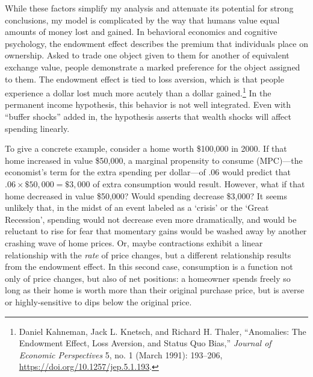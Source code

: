 \documentclass[12pt,oneside]{psthesis}
\begin{document}
While these factors simplify my analysis and attenuate its potential for strong conclusions, my model is complicated by the way that humans value equal amounts of money lost and gained.
In behavioral economics and cognitive psychology, the endowment effect describes the premium that individuals place on ownership.
Asked to trade one object given to them for another of equivalent exchange value, people demonstrate a marked preference for the object assigned to them.
The endowment effect is tied to loss aversion, which is that people experience a dollar lost much more acutely than a dollar gained.\footnote{Daniel Kahneman, Jack L. Knetsch, and Richard H. Thaler, ``Anomalies: The Endowment Effect, Loss Aversion, and Status Quo Bias,'' \emph{Journal of Economic Perspectives} 5, no. 1 (March 1991): 193--206, \url{https://doi.org/10.1257/jep.5.1.193}.}
In the permanent income hypothesis, this behavior is not well integrated.
Even with ``buffer shocks'' added in, the hypothesis asserts that wealth shocks will affect spending linearly.

To give a concrete example, consider a home worth \$100,000 in 2000.
If that home increased in value \$50,000, a marginal propensity to consume (MPC)---the economist's term for the extra spending per dollar---of .06 would predict that \(.06 \times \$50,000 = \$3,000\) of extra consumption would result.
However, what if that home decreased in value \$50,000?
Would spending decrease \$3,000?
It seems unlikely that, in the midst of an event labeled as a `crisis' or the `Great Recession', spending would not decrease even more dramatically, and would be reluctant to rise for fear that momentary gains would be washed away by another crashing wave of home prices.
Or, maybe contractions exhibit a linear relationship with the \emph{rate} of price changes, but a different relationship results from the endowment effect.
In this second case, consumption is a function not only of price changes, but also of net positions: a homeowner spends freely so long as their home is worth more than their original purchase price, but is averse or highly-sensitive to dips below the original price.
\end{document}
